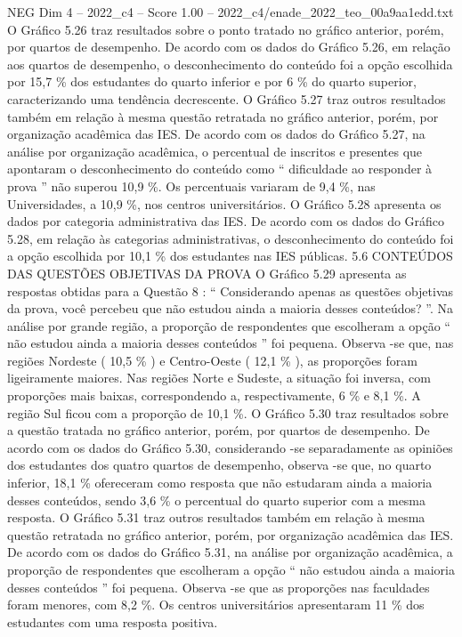 \begin{textsample}{NEG Dim 4 – 2022\_c4 – Score 1.00 – 2022\_c4/enade\_2022\_teo\_00a9aa1edd.txt}
O Gráfico 5.26 traz resultados sobre o ponto tratado no gráfico anterior, porém, por quartos de desempenho.
De acordo com os dados do Gráfico 5.26, em relação aos quartos de desempenho, o desconhecimento do conteúdo foi a opção escolhida por 15,7 \% dos estudantes do quarto inferior e por 6 \% do quarto superior, caracterizando uma tendência decrescente.
O Gráfico 5.27 traz outros resultados também em relação à mesma questão retratada no gráfico anterior, porém, por organização acadêmica das IES.
De acordo com os dados do Gráfico 5.27, na análise por organização acadêmica, o percentual de inscritos e presentes que apontaram o desconhecimento do conteúdo como “ dificuldade ao responder à prova ” não superou 10,9 \%.
Os percentuais variaram de 9,4 \%, nas Universidades, a 10,9 \%, nos centros universitários.
O Gráfico 5.28 apresenta os dados por categoria administrativa das IES.
De acordo com os dados do Gráfico 5.28, em relação às categorias administrativas, o desconhecimento do conteúdo foi a opção escolhida por 10,1 \% dos estudantes nas IES públicas. 5.6 CONTEÚDOS DAS QUESTÕES OBJETIVAS DA PROVA O Gráfico 5.29 apresenta as respostas obtidas para a Questão 8 : “ Considerando apenas as questões objetivas da prova, você percebeu que não estudou ainda a maioria desses conteúdos? ”.
Na análise por grande região, a proporção de respondentes que escolheram a opção “ não estudou ainda a maioria desses conteúdos ” foi pequena.
Observa -se que, nas regiões Nordeste ( 10,5 \% ) e Centro-Oeste ( 12,1 \% ), as proporções foram ligeiramente maiores.
Nas regiões Norte e Sudeste, a situação foi inversa, com proporções mais baixas, correspondendo a, respectivamente, 6 \% e 8,1 \%.
A região Sul ficou com a proporção de 10,1 \%.
O Gráfico 5.30 traz resultados sobre a questão tratada no gráfico anterior, porém, por quartos de desempenho.
De acordo com os dados do Gráfico 5.30, considerando -se separadamente as opiniões dos estudantes dos quatro quartos de desempenho, observa -se que, no quarto inferior, 18,1 \% ofereceram como resposta que não estudaram ainda a maioria desses conteúdos, sendo 3,6 \% o percentual do quarto superior com a mesma resposta.
O Gráfico 5.31 traz outros resultados também em relação à mesma questão retratada no gráfico anterior, porém, por organização acadêmica das IES.
De acordo com os dados do Gráfico 5.31, na análise por organização acadêmica, a proporção de respondentes que escolheram a opção “ não estudou ainda a maioria desses conteúdos ” foi pequena.
Observa -se que as proporções nas faculdades foram menores, com 8,2 \%.
Os centros universitários apresentaram 11 \% dos estudantes com uma resposta positiva.

\end{textsample}
